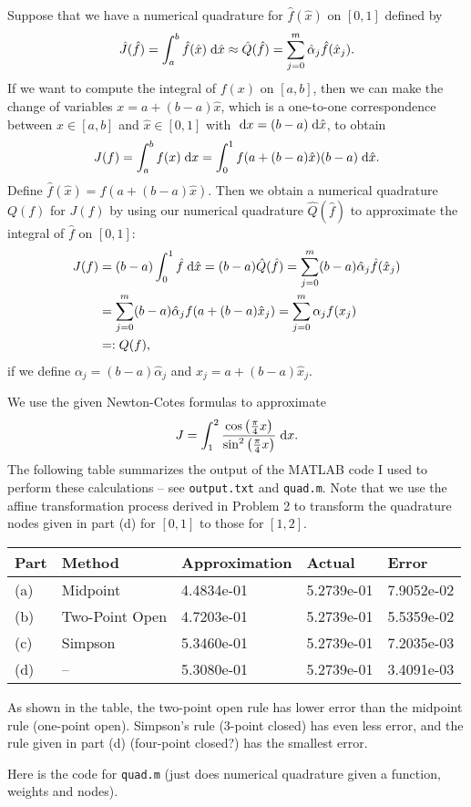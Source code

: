 \documentclass{homework}
\begin{document}
	\question
	Suppose that we have a numerical quadrature for $\hat{f}(\hat{x})$ on $[0,1]$ defined by
	\begin{equation}
		\hat{J}(\hat{f}) = \int_a^b \hat{f}(\hat{x})\;\text{d}\hat{x} \approx \hat{Q}(\hat{f}) = \sum_{j=0}^m \hat{\alpha}_j \hat{f}(\hat{x}_j).
	\end{equation}
	If we want to compute the integral of $f(x)$ on $[a,b]$, then we can make the change of variables $x = a + (b-a)\hat{x}$, which is a one-to-one correspondence between $x \in [a,b]$ and $\hat{x} \in [0,1]$ with $\;\text{d} x = (b-a)\;\text{d}\hat{x}$, to obtain
	\begin{equation}
		J(f) = \int_a^bf(x)\;\text{d} x = \int_0^1 f(a + (b-a)\hat{x})(b-a)\;\text{d}\hat{x}.
	\end{equation}
	Define $\hat{f}(\hat{x}) = f(a+(b-a)\hat{x})$. Then we obtain a numerical quadrature $Q(f)$ for $J(f)$ by using our numerical quadrature $\hat{Q}(\hat{f})$ to approximate the integral of $\hat{f}$ on $[0,1]$:
	\begin{align}
		J(f) &= (b-a)\int_0^1\hat{f}\;\text{d}\hat{x} = (b-a)\hat{Q}(\hat{f}) = \sum_{j=0}^m (b-a)\hat{\alpha}_j \hat{f}(\hat{x}_j) \\
		&= \sum_{j=0}^m (b-a)\hat{\alpha}_jf(a+(b-a)\hat{x}_j) = \sum_{j=0}^m \alpha_jf(x_j) \\
		&=: Q(f),
	\end{align}
	if we define $\alpha_j = (b-a)\hat{\alpha}_j$ and $x_j = a + (b-a)\hat{x}_j$.
	
	\question 
	We use the given Newton-Cotes formulas to approximate
	\begin{equation}
		J = \int_1^2\frac{\cos\left(\frac{\pi}{4}x\right)}{\sin^2\left(\frac{\pi}{4}x\right)}\;\text{d} x.
	\end{equation}
	The following table summarizes the output of the MATLAB code I used to perform these calculations -- see \verb*|output.txt| and \verb*|quad.m|. Note that we use the affine transformation process derived in Problem 2 to transform the quadrature nodes given in part (d) for $[0,1]$ to those for $[1,2]$.
	\begin{table}[H]
		\centering
		\begin{tabular}{@{}lllll@{}}
			\toprule
			Part & Method & Approximation & Actual & Error \\
			\midrule
			(a) & Midpoint & 4.4834e-01 & 5.2739e-01 & 7.9052e-02 \\
			(b) & Two-Point Open & 4.7203e-01 & 5.2739e-01 & 5.5359e-02 \\
			(c) & Simpson & 5.3460e-01 & 5.2739e-01 & 7.2035e-03 \\
			(d) & -- & 5.3080e-01 & 5.2739e-01 & 3.4091e-03 \\
			\bottomrule
		\end{tabular}
	\end{table}
	As shown in the table, the two-point open rule has lower error than the midpoint rule (one-point open). Simpson's rule (3-point closed) has even less error, and the rule given in part (d) (four-point closed?) has the smallest error.
	
	Here is the code for \verb*|quad.m| (just does numerical quadrature given a function, weights and nodes).
	
\end{document}
